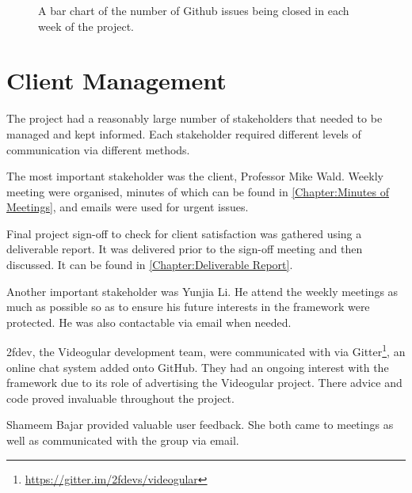 \begin{figure}
\centering
{}
  \caption{A bar chart of the number of Github issues being closed in each week of the project.}
  \label{fig:tasksweek}
\end{figure}

\section{Client Management} 
\label{Section:Client Management}

The project had a reasonably large number of stakeholders that needed to be managed and kept informed. Each stakeholder required different levels of communication via different methods.

The most important stakeholder was the client, Professor Mike Wald. Weekly meeting were organised, minutes of which can be found in \autoref{Chapter:Minutes of Meetings}, and emails were used for urgent issues. 

Final project sign-off to check for client satisfaction was gathered using a deliverable report. It was delivered prior to the sign-off meeting and then discussed. It can be found in \autoref{Chapter:Deliverable Report}.

Another important stakeholder was Yunjia Li. He attend the weekly meetings as much as possible so as to ensure his future interests in the framework were protected. He was also contactable via email when needed.

2fdev, the Videogular development team, were communicated with via Gitter\footnote{\url{https://gitter.im/2fdevs/videogular}}, an online chat system added onto GitHub. They had an ongoing interest with the framework due to its role of advertising the Videogular project.  There advice and code proved invaluable throughout the project.

Shameem Bajar provided valuable user feedback. She both came to meetings as well as communicated with the group via email.

